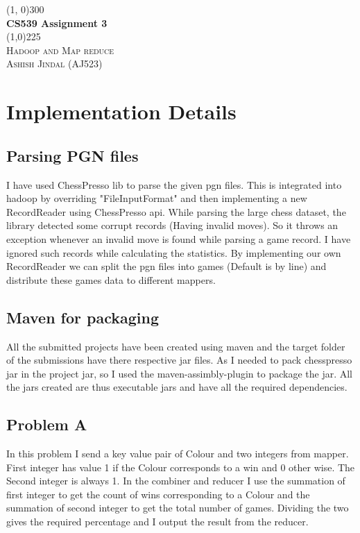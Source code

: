 \documentclass{article}
\begin{document}
\begin{titlepage}
\begin{center}

\line(1, 0){300}\\
[4mm]
\huge{\bfseries CS539 Assignment 3}\\
\line(1,0){225}\\
[4mm]
\textsc{\Large Hadoop and Map reduce}\\
\textsc{\large Ashish Jindal (AJ523)}

\end{center}	

\section{Implementation Details}
\subsection{Parsing PGN files}
I have used ChessPresso lib to parse the given pgn files. This is integrated into hadoop by overriding "FileInputFormat" and then implementing a new RecordReader using ChessPresso api. While parsing the large chess dataset, the library detected some corrupt records (Having invalid moves). So it throws an exception whenever an invalid move is found while parsing a game record. I have ignored such records while calculating the statistics. By implementing our own RecordReader we can split the pgn files into games (Default is by line) and distribute these games data to different mappers.

\subsection{Maven for packaging}
All the submitted projects have been created using maven and the target folder of the submissions have there respective jar files. As I needed to pack chesspresso jar in the project jar, so I used the maven-assimbly-plugin to package the jar. All the jars created are thus executable jars and have all the required dependencies.

\subsection{Problem A}
In this problem I send a key value pair of Colour and two integers from mapper. First integer has value 1 if the Colour corresponds to a win and 0 other wise. The Second integer is always 1. In the combiner and reducer I use the summation of first integer to get the count of wins corresponding to a Colour and the summation of second integer to get the total number of games. Dividing the two gives the required percentage and I output the result from the reducer.


\end{titlepage}
\end{document}
